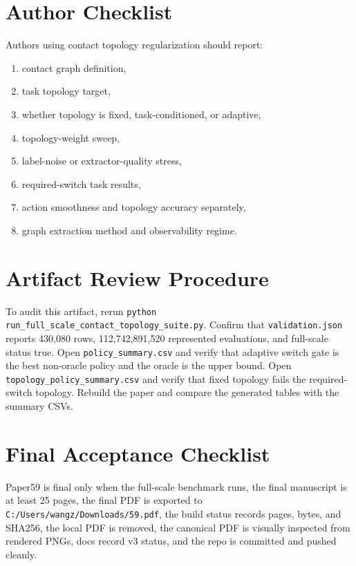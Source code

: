 \documentclass{article}
\begin{document}
\section{Author Checklist}

Authors using contact topology regularization should report:
\begin{enumerate}
    \item contact graph definition,
    \item task topology target,
    \item whether topology is fixed, task-conditioned, or adaptive,
    \item topology-weight sweep,
    \item label-noise or extractor-quality stress,
    \item required-switch task results,
    \item action smoothness and topology accuracy separately,
    \item graph extraction method and observability regime.
\end{enumerate}

\section{Artifact Review Procedure}

To audit this artifact, rerun \texttt{python run\_full\_scale\_contact\_topology\_suite.py}. Confirm that \texttt{validation.json} reports 430,080 rows, 112,742,891,520 represented evaluations, and full-scale status true. Open \texttt{policy\_summary.csv} and verify that adaptive switch gate is the best non-oracle policy and the oracle is the upper bound. Open \texttt{topology\_policy\_summary.csv} and verify that fixed topology fails the required-switch topology. Rebuild the paper and compare the generated tables with the summary CSVs.

\section{Final Acceptance Checklist}

Paper59 is final only when the full-scale benchmark runs, the final manuscript is at least 25 pages, the final PDF is exported to \texttt{C:/Users/wangz/Downloads/59.pdf}, the build status records pages, bytes, and SHA256, the local PDF is removed, the canonical PDF is visually inspected from rendered PNGs, docs record v3 status, and the repo is committed and pushed cleanly.



\end{document}
